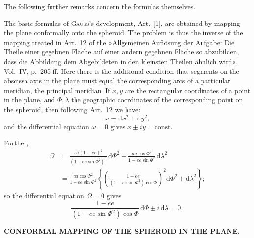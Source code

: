 {The following further remarks concern the formulas themselves.

The basic formulas of \textsc{Gauss}'s development, Art.\ [1], are obtained by
mapping the plane conformally onto the spheroid. The problem is thus the inverse
of the mapping treated in Art.\ 12 of the »Allgemeinen Auflösung der Aufgabe:
Die Theile einer gegebnen Fläche auf einer andern gegebnen Fläche so abzubilden,
dass die Abbildung dem Abgebildeten in den kleinsten Theilen ähnlich wird«,
Vol.\ IV, p.\ 205 ff. Here there is the additional condition that segments on
the abscissa axis in the plane must equal the corresponding arcs of a particular
meridian, the principal meridian. If \(x,y\) are the rectangular coordinates of a point
in the plane, and \(\Phi,\lambda\) the geographic coordinates of the corresponding
point on the spheroid, then following Art.\ 12 we have:
\[
\omega=\mathrm dx^2+\mathrm dy^2,
\]
\noindent and the differential equation \(\omega=0\) gives \(x\pm iy=\mathrm{const.}\)

Further,
\[
\begin{aligned}
\Omega&=\frac{aa(1-ee)^2}{(1-ee\sin\Phi^2)^3}\,\mathrm d\Phi^2
 +\frac{aa\cos\Phi^2}{1-ee\sin\Phi^2}\,\mathrm d\lambda^2\\
&=\frac{aa\cos\Phi^2}{1-ee\sin\Phi^2}
\left\{\left(\frac{1-ee}{(1-ee\sin\Phi^2)\cos\Phi}\right)^2
 \mathrm d\Phi^2+\mathrm d\lambda^2\right\};
\end{aligned}
\]
\noindent so the differential equation \(\Omega=0\) gives
\[
\frac{1-ee}{(1-ee\sin\Phi^2)\cos\Phi}\,\mathrm d\Phi\pm i\,\mathrm d\lambda=0,
\]
\par}

\par\clearpage
\noindent\null\hfill{\small\textbf{CONFORMAL MAPPING OF THE SPHEROID IN THE PLANE.}}\hfill{}\par\medskip

